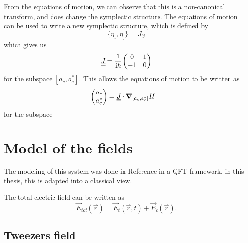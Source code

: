 From the equations of motion, we can observe that this is a non-canonical transform, 
    and does change the symplectic structure.
The equations of motion can be used to write a new symplectic structure, 
    which is defined by
\begin{equation}
    \{\eta_i, \eta_j\} = J_{ij}
\end{equation}
which gives us
\begin{equation}
    \underline{\underline{J}} = \frac{1}{\mathrm{i}\hbar} \begin{pmatrix}
        0 & 1 \\
        -1 & 0
    \end{pmatrix}
\end{equation}
for the subspace $[a_c, a_c^*]$.
This allows the equations of motion to be written as
\begin{align}
    \begin{pmatrix}
        a_c \\a_c^*
    \end{pmatrix} &= \underline{\underline{J}} \cdot \bm{\nabla}_{[a_c, a^*_c]}H
\end{align}
for the subspace.

\section{Model of the fields}
\label{sec:sp:model}

The modeling of this system was done in Reference \cite{Gonzalez_Ballestero_2019} in a QFT framework,
    in this thesis,
    this is adapted into a classical view.
\par

The total electric field can be written as
\begin{equation}
    \vec E_{tot}(\vec r) = \vec E_t(\vec r, t) + \vec E_c(\vec r).
\end{equation}

\subsection{Tweezers field}
\label{ssec:sp:model:tweezer}

